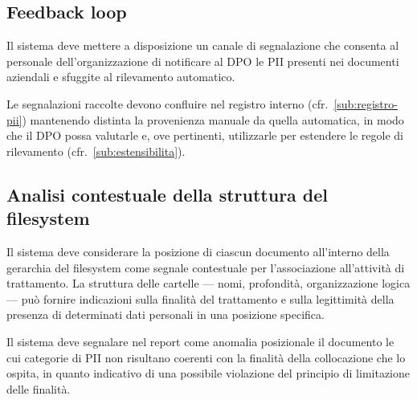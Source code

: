 \subsection{Feedback loop}
\label{sub:feedback-loop}
Il sistema deve mettere a disposizione un canale di segnalazione che consenta al personale dell'organizzazione di notificare al DPO le PII presenti nei documenti aziendali e sfuggite al rilevamento automatico. \medskip

Le segnalazioni raccolte devono confluire nel registro interno (cfr.~\ref{sub:registro-pii}) mantenendo distinta la provenienza manuale da quella automatica, in modo che il DPO possa valutarle e, ove pertinenti, utilizzarle per estendere le regole di rilevamento (cfr.~\ref{sub:estensibilita}).

\subsection{Analisi contestuale della struttura del filesystem}
\label{sub:analisi-filesystem}
Il sistema deve considerare la posizione di ciascun documento all'interno della gerarchia del filesystem come segnale contestuale per l'associazione all'attività di trattamento. La struttura delle cartelle --- nomi, profondità, organizzazione logica --- può fornire indicazioni sulla finalità del trattamento e sulla legittimità della presenza di determinati dati personali in una posizione specifica. \medskip

Il sistema deve segnalare nel report come anomalia posizionale il documento le cui categorie di PII non risultano coerenti con la finalità della collocazione che lo ospita, in quanto indicativo di una possibile violazione del principio di limitazione delle finalità.

